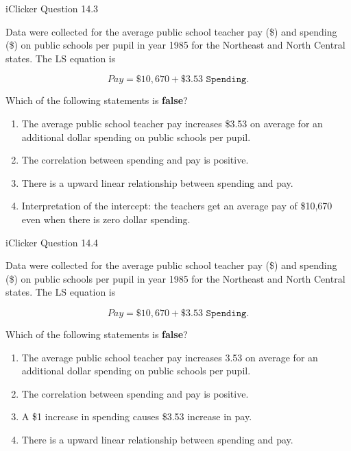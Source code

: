 \documentclass[14pt]{beamer}\usepackage[]{graphicx}\usepackage[]{color}
\begin{document}
\begin{frame}[fragile]{iClicker Question 14.3}

{\footnotesize{
Data were collected for the average public school teacher pay (\$) and  spending (\$) on public schools per pupil in year 1985 for the Northeast  and North Central states. The LS equation is

{\footnotesize{
\begin{equation*}
Pay = \$10,670 + \$3.53 \texttt{ Spending.}
\end{equation*}
}}

\vspace{-3mm}

Which of the following statements is \textbf{false}?

\begin{enumerate}[A]
\item The average public school teacher pay increases \$3.53  on average for an additional dollar spending on public  schools per pupil.
\item The correlation between spending and pay is positive. 
\item There is a upward linear relationship between spending and pay. 
\item Interpretation of the intercept: the teachers get an average pay of  \$10,670 even when there is zero dollar spending.
\end{enumerate}
}}
\end{frame}

\begin{frame}[fragile]{iClicker Question 14.4}

{\footnotesize{
Data were collected for the average public school teacher pay (\$) and  spending (\$) on public schools per pupil in year 1985 for the Northeast  and North Central states. The LS equation is

{\footnotesize{
\begin{equation*}
Pay = \$10,670 + \$3.53 \texttt{ Spending.}
\end{equation*}
}}

\vspace{-3mm}

Which of the following statements is \textbf{false}?

\begin{enumerate}[A]
\item The average public school teacher pay increases 3.53 on  average for an additional dollar spending on public  schools per pupil.
\item The correlation between spending and pay is positive.
\item A \$1 increase in spending causes \$3.53 increase in pay.
\item There is a upward linear relationship between spending  and pay.
\end{enumerate}
}}
\end{frame}
\end{document}
